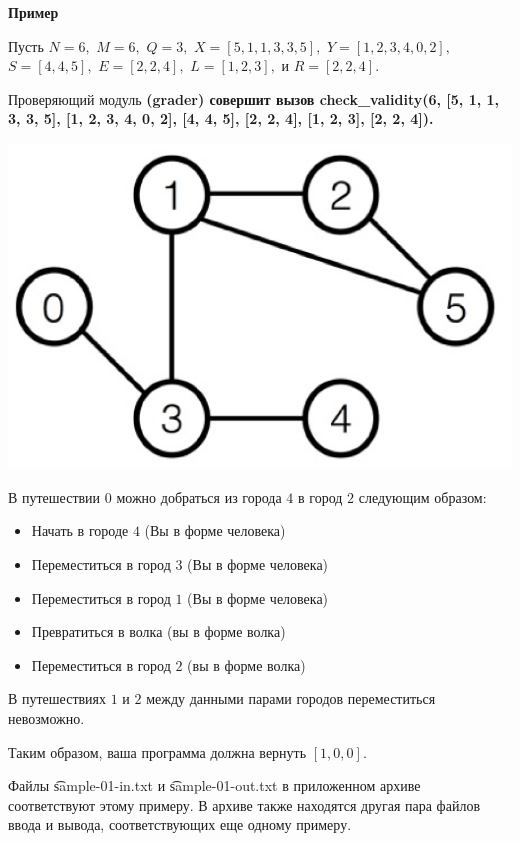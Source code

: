 \bf{Пример}

Пусть $N=6,$ $M=6,$ $Q=3,$ $X=[5,1,1,3,3,5],$ $Y=[1,2,3,4,0,2],$ $S=[4,4,5],$ $E=[2,2,4],$ $L=[1,2,3],$ и $R=[2,2,4].$

Проверяющий модуль \bf{(grader)} совершит вызов\t{ check_validity(6, [5, 1, 1, 3, 3, 5], [1, 2, 3, 4, 0, 2], [4, 4, 5], [2, 2, 4], [1, 2, 3], [2, 2, 4]).}

\includegraphics{image.png}

В путешествии $0$ можно добраться из города $4$ в город $2$ следующим образом:

\begin{itemize}
\item Начать в городе $4$ (Вы в форме человека) 
\item Переместиться в город $3$ (Вы в форме человека)
\item Переместиться в город $1$ (Вы в форме человека) 
\item Превратиться в волка (вы в форме волка) 
\item Переместиться в город $2$ (вы в форме волка)
\end{itemize}

В путешествиях $1$ и $2$ между данными парами городов переместиться невозможно.

Таким образом, ваша программа должна вернуть $[1,0,0].$

Файлы \t{sample-01-in.txt} и \t{sample-01-out.tx}t в приложенном архиве соответствуют этому примеру. В архиве также находятся другая пара файлов ввода и вывода, соответствующих еще одному примеру.

